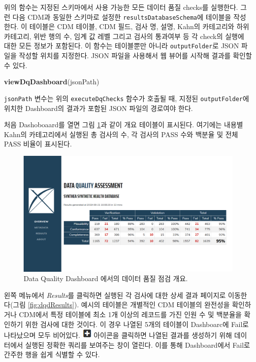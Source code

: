 \documentclass[11pt]{book}
\newenvironment{Shaded}{\begin{snugshade}}{\end{snugshade}}
\newcommand{\KeywordTok}[1]{\textcolor[rgb]{0.13,0.29,0.53}{\textbf{#1}}}
\newcommand{\NormalTok}[1]{#1}
\theoremstyle{definition}
\theoremstyle{definition}
\theoremstyle{definition}
\theoremstyle{remark}
\begin{document}
위의 함수는 지정된 스키마에서 사용 가능한 모든 데이터 품질 checks를
실행한다. 그런 다음 CDM과 동일한 스키마로 설정한
\texttt{resultsDatabaseSchema}에 테이블을 작성한다. 이 테이블은 CDM
테이블, CDM 필드, 검사 명, 설명, Kahn의 카테고리와 하위 카테고리, 위반
행의 수, 임계 값 레벨 그리고 검사의 통과여부 등 각 check의 실행에 대한
모든 정보가 포함된다. 이 함수는 테이블뿐만 아니라
\texttt{outputFolder}로 JSON 파일을 작성할 위치를 지정한다. JSON 파일을
사용해서 웹 뷰어를 시작해 결과를 확인할 수 있다.

\begin{Shaded}
\begin{Highlighting}[]
\KeywordTok{viewDqDashboard}\NormalTok{(jsonPath)}
\end{Highlighting}
\end{Shaded}

\texttt{jsonPath} 변수는 위의 \texttt{executeDqChecks} 함수가 호출될 때,
지정된 \texttt{outputFolder}에 위치한 Dashboard의 결과가 포함된 JSON
파일의 경로여야 한다.

처음 Dashoboaard를 열면 그림 \ref{fig:dqdOverview}과 같이 개요 테이블이
표시된다. 여기에는 내용별 Kahn의 카테고리에서 실행된 총 검사의 수, 각
검사의 PASS 수와 백분율 및 전체 PASS 비율이 표시된다.

\begin{figure}

{\centering \includegraphics[width=1\linewidth]{images/DataQuality/dqdOverview} 

}

\caption{Data Quality Dashboard 에서의 데이터 품질 점검 개요.}\label{fig:dqdOverview}
\end{figure}

왼쪽 메뉴에서 \emph{Results}를 클릭하면 실행된 각 검사에 대한 상세 결과
페이지로 이동한다(그림 \ref{fig:dqdResults}). 예시의 테이블은 개별적인
CDM 테이블의 완전성을 확인하거나 CDM에서 특정 테이블에 최소 1개 이상의
레코드를 가진 인원 수 및 백분율을 확인하기 위한 검사에 대한 것이다. 이
경우 나열된 5개의 테이블이 Dashboarc에 Fail로 나타났으며 모두 비어있다.
\includegraphics{images/DataQuality/plusIcon.png} 아이콘을 클릭하면
나열된 결과를 생성하기 위해 데이터에서 실행된 정확한 쿼리를 보여주는
창이 열린다. 이를 통해 Dashboard에서 Fail로 간주한 행을 쉽게 식별할 수
있다.
\end{document}
